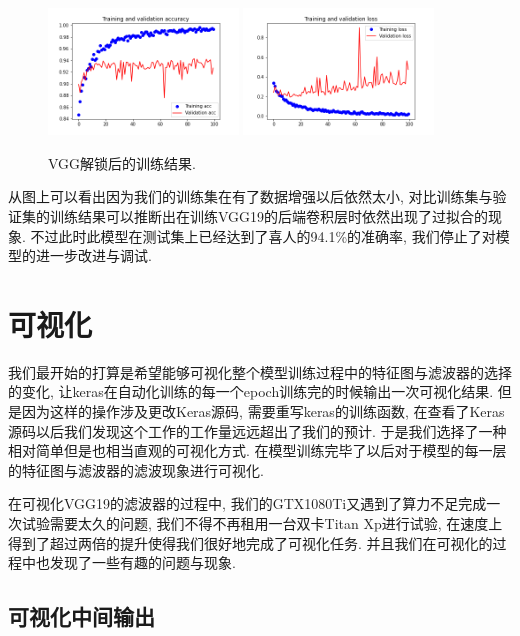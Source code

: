 \documentclass[lang=cn,11pt]{elegantpaper}
\begin{document}
\begin{figure}[hbt]
\centering
 \includegraphics[width=0.45\textwidth]{VGG_19_unlocked_1}
  \includegraphics[width=0.45\textwidth]{VGG_19_unlocked_2}
 \caption{VGG解锁后的训练结果.\label{fig:vggunlock}}
\end{figure}

从图上可以看出因为我们的训练集在有了数据增强以后依然太小, 对比训练集与验证集的训练结果可以推断出在训练VGG19的后端卷积层时依然出现了过拟合的现象. 不过此时此模型在测试集上已经达到了喜人的94.1\%的准确率, 我们停止了对模型的进一步改进与调试.

\section{可视化}

我们最开始的打算是希望能够可视化整个模型训练过程中的特征图与滤波器的选择的变化, 让keras在自动化训练的每一个epoch训练完的时候输出一次可视化结果. 但是因为这样的操作涉及更改Keras源码, 需要重写keras的训练函数, 在查看了Keras源码以后我们发现这个工作的工作量远远超出了我们的预计. 于是我们选择了一种相对简单但是也相当直观的可视化方式. 在模型训练完毕了以后对于模型的每一层的特征图与滤波器的滤波现象进行可视化.

在可视化VGG19的滤波器的过程中, 我们的GTX1080Ti又遇到了算力不足完成一次试验需要太久的问题, 我们不得不再租用一台双卡Titan Xp进行试验, 在速度上得到了超过两倍的提升使得我们很好地完成了可视化任务. 并且我们在可视化的过程中也发现了一些有趣的问题与现象.

\subsection{可视化中间输出}
\end{document}
